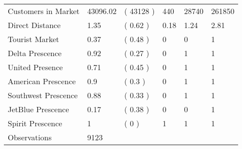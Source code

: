 \begin{tabular}[t]{llllll}
\hspace{1em}Customers in Market & 43096.02 & ( 43128 ) & 440 & 28740 & 261850\\
\hspace{1em}Direct Distance & 1.35 & ( 0.62 ) & 0.18 & 1.24 & 2.81\\
\hspace{1em}Tourist Market & 0.37 & ( 0.48 ) & 0 & 0 & 1\\
\hspace{1em}Delta Prescence & 0.92 & ( 0.27 ) & 0 & 1 & 1\\
\hspace{1em}United Presence & 0.71 & ( 0.45 ) & 0 & 1 & 1\\
\hspace{1em}American Prescence & 0.9 & ( 0.3 ) & 0 & 1 & 1\\
\hspace{1em}Southwest Prescence & 0.88 & ( 0.33 ) & 0 & 1 & 1\\
\hspace{1em}JetBlue Prescence & 0.17 & ( 0.38 ) & 0 & 0 & 1\\
\hspace{1em}Spirit Prescence & 1 & ( 0 ) & 1 & 1 & 1\\
\midrule
\hspace{1em}Observations & 9123 &  &  &  & \\
\bottomrule
\end{tabular}
